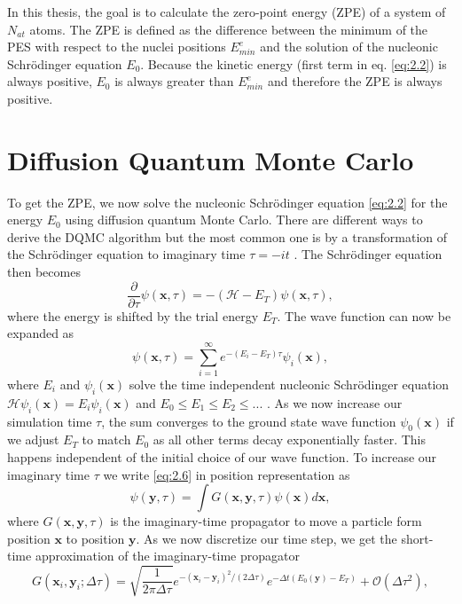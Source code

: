 \documentclass [12pt]{report}
\begin{document}
In this thesis, the goal is to calculate the zero-point energy (ZPE) of a system of $N_{at}$ atoms. The ZPE is defined as the difference between the minimum of the PES with respect to the nuclei positions $E_{min}^e$ and the solution of the nucleonic Schrödinger equation $E_0$. Because the kinetic energy (first term in eq. \eqref{eq:2.2}) is always positive, $E_0$ is always greater than $E_{min}^e$ and therefore the ZPE is always positive.

\section{Diffusion Quantum Monte Carlo}
To get the ZPE, we now solve the nucleonic Schrödinger equation \eqref{eq:2.2} for the energy $E_0$ using diffusion quantum Monte Carlo. There are different ways to derive the DQMC algorithm but the most common one is by a transformation of the Schrödinger equation to imaginary time $\tau = -it$ \cite{mccoy,cyrus,herleitung2}. The Schrödinger equation then becomes
\begin{equation} \label{eq:2.5}
\frac{\partial}{\partial \tau} \psi(\bm{x},\tau) = -(\mathcal{H} - E_T) \psi(\bm{x},\tau),
\end{equation}
where the energy is shifted by the trial energy $E_T$. The wave function can now be expanded as
\begin{equation} \label{eq:2.6}
\psi(\bm{x},\tau) = \sum_{i=1}^{\infty} e^{-(E_i - E_T)\tau}\psi_i(\bm{x}),
\end{equation}
where $E_i$ and $\psi_i(\bm{x})$ solve the time independent nucleonic Schrödinger equation $\mathcal{H}\psi_i(\bm{x}) = E_i \psi_i(\bm{x})$ and $E_0 \leq E_1 \leq E_2 \leq...$ .
As we now increase our simulation time $\tau$, the sum converges to the ground state wave function $\psi_0(\bm{x})$ if we adjust $E_T$ to match $E_0$ as all other terms decay exponentially faster. This happens independent of the initial choice of our wave function.
To increase our imaginary time $\tau$ we write \eqref{eq:2.6} in position representation as
\begin{equation} \label{propagate}
\psi(\bm{y},\tau) = \int G(\bm{x},\bm{y},\tau) \psi(\bm{x}) d \bm{x},
\end{equation}
where $G(\bm{x},\bm{y},\tau)$ is the imaginary-time propagator to move a particle form position $\bm{x}$ to position $\bm{y}$. 
As we now discretize our time step, we get the short-time approximation of the imaginary-time  propagator 
\begin{equation} \label{eq:2.7}
G(\bm{x}_i,\bm{y}_i;\Delta \tau) = \sqrt{\frac{1}{2 \pi \Delta \tau}} e^{-(\bm{x}_i-\bm{y}_i)^2 /(2 \Delta \tau)} e^{-\Delta t (E_0(\bm{y}) - E_T)} + \mathcal{O}(\Delta \tau^2),
\end{equation}
\end{document}

